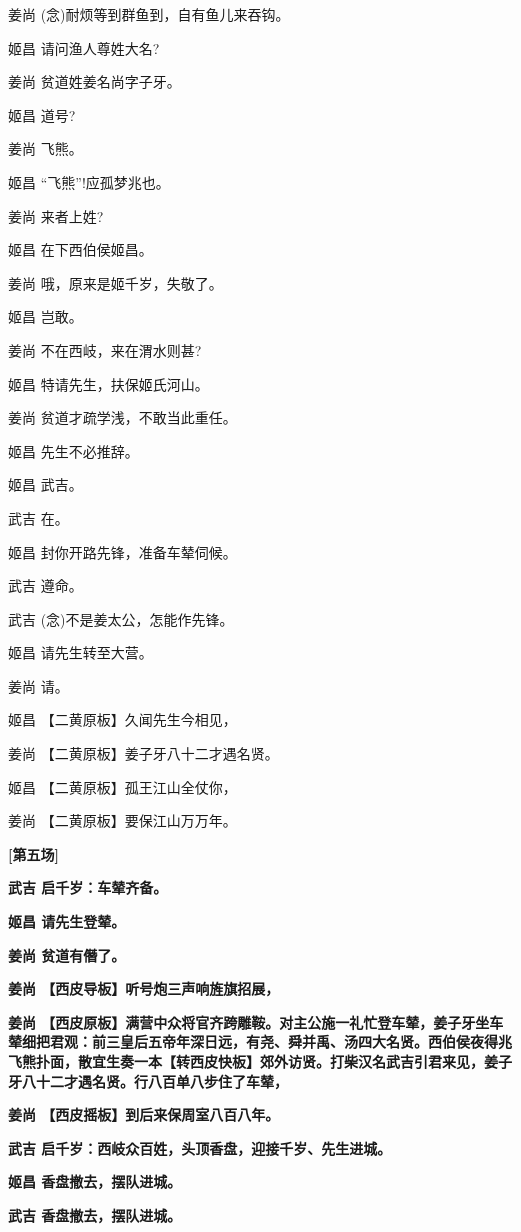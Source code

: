 {姜尚 (念)耐烦等到群鱼到，自有鱼儿来吞钩。

姬昌 请问渔人尊姓大名?

姜尚 贫道姓姜名尚字子牙。

姬昌 道号?

姜尚 飞熊。

姬昌 ``飞熊''!应孤梦兆也。

姜尚 来者上姓?

姬昌 在下西伯侯姬昌。

姜尚 哦，原来是姬千岁，失敬了。

姬昌 岂敢。

姜尚 不在西岐，来在渭水则甚?

姬昌 特请先生，扶保姬氏河山。

姜尚 贫道才疏学浅，不敢当此重任。

姬昌 先生不必推辞。

姬昌 武吉。

武吉 在。

姬昌 封你开路先锋，准备车辇伺候。

武吉 遵命。

武吉 (念)不是姜太公，怎能作先锋。

姬昌 请先生转至大营。

姜尚 请。

姬昌 【二黄原板】久闻先生今相见，

姜尚 【二黄原板】姜子牙八十二才遇名贤。

姬昌 【二黄原板】孤王江山全仗你，

姜尚 【二黄原板】要保江山万万年。

{\centerline{\textbf{{[}\hei 第五场{]}}}}

\textbf{武吉 启千岁：车辇齐备。}

\textbf{姬昌 请先生登辇。}

\textbf{姜尚 贫道有僭了。}

\textbf{姜尚 【西皮导板】听号炮三声响旌旗招展，}

\textbf{姜尚
【西皮原板】满营中众将官齐跨雕鞍。对主公施一礼忙登车辇，姜子牙坐车辇细把君观：前三皇后五帝年深日远，有尧、舜并禹、汤四大名贤。西伯侯夜得兆飞熊扑面，散宜生奏一本【转西皮快板】郊外访贤。打柴汉名武吉引君来见，姜子牙八十二才遇名贤。行八百单八步住了车辇，}

\textbf{姜尚 【西皮摇板】到后来保周室八百八年。}

\textbf{武吉 启千岁：西岐众百姓，头顶香盘，迎接千岁、先生进城。}

\textbf{姬昌 香盘撤去，摆队进城。}

\textbf{武吉 香盘撤去，摆队进城。}
}

